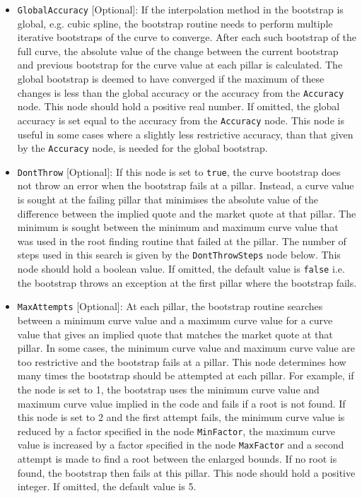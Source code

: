 \documentclass[12pt, a4paper]{article}
\begin{document}
{{\begin{itemize}
\item \lstinline!GlobalAccuracy! [Optional]:
If the interpolation method in the bootstrap is global, e.g. cubic spline, the bootstrap routine needs to perform multiple iterative bootstraps of the curve to converge. After each such bootstrap of the full curve, the absolute value of the change between the current bootstrap and previous bootstrap for the curve value at each pillar is calculated. The global bootstrap is deemed to have converged if the maximum of these changes is less than the global accuracy or the accuracy from the \lstinline!Accuracy! node. This node should hold a positive real number. If omitted, the global accuracy is set equal to the accuracy from the \lstinline!Accuracy! node. This node is useful in some cases where a slightly less restrictive accuracy, than that given by the \lstinline!Accuracy! node, is needed for the global bootstrap.

\item \lstinline!DontThrow! [Optional]:
If this node is set to \lstinline!true!, the curve bootstrap does not throw an error when the bootstrap fails at a pillar. Instead, a curve value is sought at the failing pillar that minimises the absolute value of the difference between the implied quote and the market quote at that pillar. The minimum is sought between the minimum and maximum curve value that was used in the root finding routine that failed at the pillar. The number of steps used in this search is given by the \lstinline!DontThrowSteps! node below. This node should hold a boolean value. If omitted, the default value is \lstinline!false! i.e. the bootstrap throws an exception at the first pillar where the bootstrap fails.

\item \lstinline!MaxAttempts! [Optional]:
At each pillar, the bootstrap routine searches between a minimum curve value and a maximum curve value for a curve value that gives an implied quote that matches the market quote at that pillar. In some cases, the minimum curve value and maximum curve value are too restrictive and the bootstrap fails at a pillar. This node determines how many times the bootstrap should be attempted at each pillar. For example, if the node is set to 1, the bootstrap uses the minimum curve value and maximum curve value implied in the code and fails if a root is not found. If this node is set to 2 and the first attempt fails, the minimum curve value is reduced by a factor specified in the node \lstinline!MinFactor!, the maximum curve value is increased by a factor specified in the node \lstinline!MaxFactor! and a second attempt is made to find a root between the enlarged bounds. If no root is found, the bootstrap then fails at this pillar. This node should hold a positive integer. If omitted, the default value is 5.


\end{itemize}}}
\end{document}
